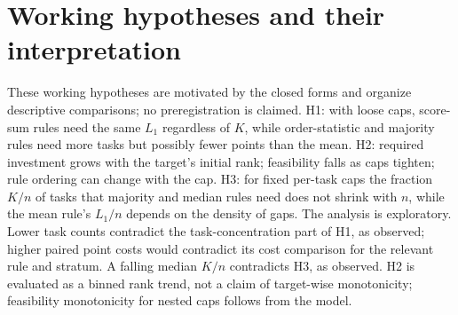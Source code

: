 \documentclass{article}
\begin{document}
\begin{table}[p]
\centering
\caption{OLLB score-component sensitivity on the same 499-model rival set. The score-rule panel examines all 498 targets except the six-task mean leader; $^\dagger$ ordinal rows examine the 40 models in both top-50 target sets, after the same exclusion. Feasible counts are within each examined set; cost ratios and their 95\% target-bootstrap intervals (1000 resamples, seed 0) use only targets feasible with positive cost in both representations. $^{\S}$The empirical cap is transferred from each parent task to its components. The 39-component mean weights BBH as 24/39, versus 1/6 in the six-task mean; this is not a pure task-count comparison. Nothing is censored. Generated by \texttt{figures/src/tables.py}.}
\label{tab:components}

\end{table}

\section{Working hypotheses and their interpretation}
\label{app:hyp}
These working hypotheses are motivated by the closed forms and organize descriptive comparisons; no preregistration is claimed. H1: with loose caps, score-sum rules need the same $L_1$ regardless of $K$, while order-statistic and majority rules need more tasks but possibly fewer points than the mean. H2: required investment grows with the target's initial rank; feasibility falls as caps tighten; rule ordering can change with the cap. H3: for fixed per-task caps the fraction $K/n$ of tasks that majority and median rules need does not shrink with $n$, while the mean rule's $L_1/n$ depends on the density of gaps. The analysis is exploratory. Lower task counts contradict the task-concentration part of H1, as observed; higher paired point costs would contradict its cost comparison for the relevant rule and stratum. A falling median $K/n$ contradicts H3, as observed. H2 is evaluated as a binned rank trend, not a claim of target-wise monotonicity; feasibility monotonicity for nested caps follows from the model.


\clearpage

\end{document}
